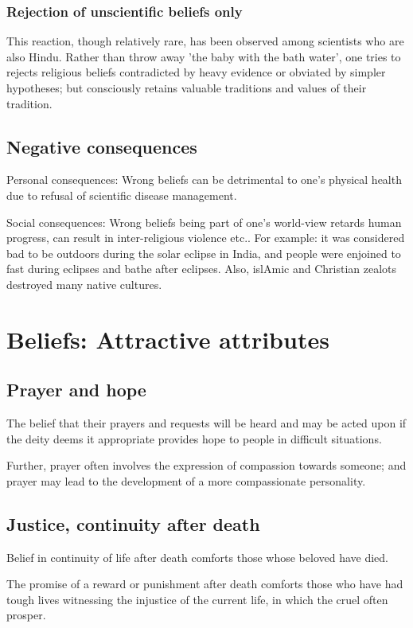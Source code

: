 \documentclass[oneside, article]{memoir}
\begin{document}
\subsubsection{Rejection of unscientific beliefs only}
This reaction, though relatively rare, has been observed among scientists who are also Hindu. Rather than throw away 'the baby with the bath water', one tries to rejects religious beliefs contradicted by heavy evidence or obviated by simpler hypotheses; but consciously retains valuable traditions and values of their tradition.

\subsection{Negative consequences}
Personal consequences: Wrong beliefs can be detrimental to one's physical health due to refusal of scientific disease management.

Social consequences: Wrong beliefs being part of one's world-view retards human progress, can result in inter-religious violence etc.. For example: it was considered bad to be outdoors during the solar eclipse in India, and people were enjoined to fast during eclipses and bathe after eclipses. Also, islAmic and Christian zealots destroyed many native cultures.

\section{Beliefs: Attractive attributes}
\subsection{Prayer and hope}
The belief that their prayers and requests will be heard and may be acted upon if the deity deems it appropriate provides hope to people in difficult situations.

Further, prayer often involves the expression of compassion towards someone; and prayer may lead to the development of a more compassionate personality.

\subsection{Justice, continuity after death}
Belief in continuity of life after death comforts those whose beloved have died.

The promise of a reward or punishment after death comforts those who have had tough lives witnessing the injustice of the current life, in which the cruel often prosper.
\end{document}
